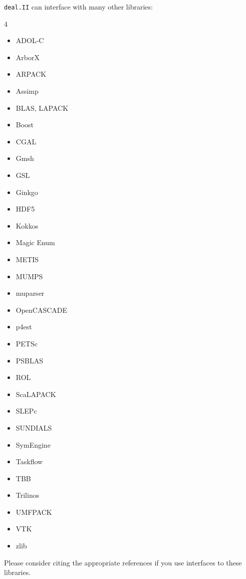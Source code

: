 \documentclass{ansarticle-preprint}
\newcommand{\specialword}[1]{\texttt{#1}}
\newcommand{\dealii}{{\specialword{deal.II}}\xspace}
\begin{document}
\dealii can interface with many other libraries:
\begin{multicols}{4}
  \begin{itemize}[leftmargin=4mm]
    \item ADOL-C \cite{griewank1996adolc}
    \item ArborX \cite{prokopenko2025}
    \item ARPACK \cite{lehoucq1998arpack}
    \item Assimp \cite{schulze2021assimp}
    \item BLAS, LAPACK \cite{anderson1999lapack}
    \item Boost \cite{boost-web-page}
    \item CGAL \cite{cgal:eb-24b}
    \item Gmsh \cite{geuzaine2009gmsh}
    \item GSL \cite{galassi2009gsl}
    \item Ginkgo \cite{anzt2020ginkgo,anzt2022ginkgo}
    \item HDF5 \cite{hdf5-web-page}
    \item Kokkos \cite{trott2022}
    \item Magic Enum \cite{magic-enum-web-page}
    \item METIS \cite{karypis1998metis}
    \item MUMPS \cite{amestoy2001mumps,amestoy2019mumps}
    \item muparser \cite{muparser-web-page}
    \item OpenCASCADE \cite{opencascade-web-page}
    \item p4est \cite{burstedde2011p4est}
    \item PETSc \cite{petsc-user-ref,petsc-web-page}
    \item PSBLAS \cite{Filippone2000psblas}
    \item ROL \cite{ROL2022ICCOPT}
    \item ScaLAPACK \cite{blackford1997scalapack}
    \item SLEPc \cite{roman2023improvements}
    \item SUNDIALS \cite{gardner2022enabling}
    \item SymEngine \cite{symengine-web-page}
    \item Taskflow \cite{huang2021taskflow}
    \item TBB \cite{reinders2007tbb}
    \item Trilinos \cite{mayr2026trilinos,trilinos-web-page}
    \item UMFPACK \cite{davis2004umfpack}
    \item VTK \cite{vtkBook}
    \item zlib \cite{zlib-web-page}
  \end{itemize}
\end{multicols}
Please consider citing the appropriate references if you use
interfaces to these libraries.
\end{document}
